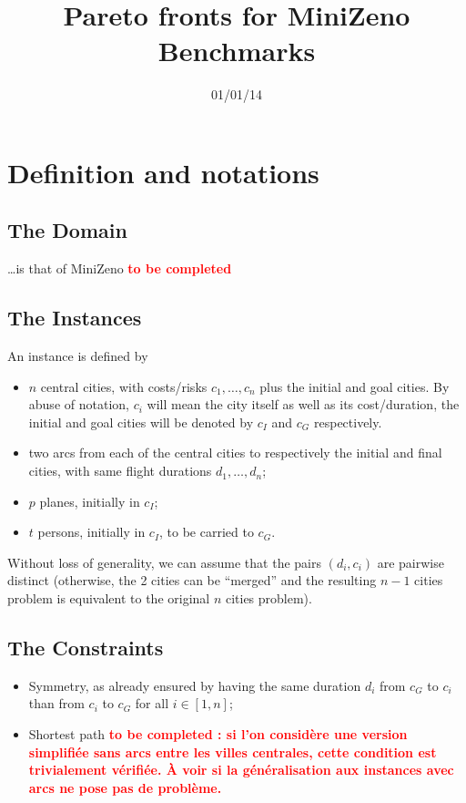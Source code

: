 \documentclass[a4paper,11pt]{article}
\date{01/01/14}
\newcommand{\myred}[1]
{\textcolor{red}{\bf {#1}}
}
\begin{document}
 \title{Pareto fronts for MiniZeno Benchmarks}

\maketitle

\section{Definition and notations}
\subsection{The Domain}
\ldots is that of MiniZeno \myred{to be completed}

\subsection{The Instances}
An instance is defined by
\begin{itemize}
 \item $n$ central cities, with costs/risks $c_1, \ldots, c_n$ plus the initial and goal cities. By abuse of notation, $c_i$ will mean the city itself as well as its cost/duration, the initial and goal cities will be denoted by $c_I$ and $c_G$ respectively.
 \item two arcs from each of the central cities to respectively the initial and final cities, with same flight durations $d_1, \ldots, d_n$;
 \item $p$ planes, initially in $c_I$;
 \item $t$ persons, initially in $c_I$, to be carried to $c_G$.
\end{itemize}

Without loss of generality, we can assume that the pairs $(d_i, c_i)$ are pairwise distinct (otherwise, the 2 cities can be ``merged'' and the resulting $n-1$ cities problem is equivalent to the original $n$ cities problem).

\subsection{The Constraints}
\begin{itemize}
 \item Symmetry, as already ensured by having the same duration $d_i$ from $c_G$ to $c_i$ than from $c_i$ to $c_G$ for all $i\in[1,n]$;
 \item Shortest path \myred{to be completed : si l'on considère une version simplifiée sans arcs entre les villes centrales, cette condition est trivialement vérifiée. À voir si la généralisation aux instances avec arcs ne pose pas de problème.}
\end{itemize}
\end{document}
